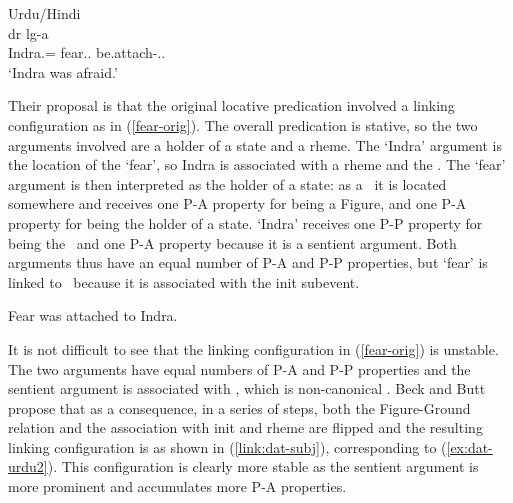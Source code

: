 \documentclass[output=paper,hidelinks]{langscibook}
\begin{document}
\ea\label{ex:dat-urdu2} Urdu/Hindi\\
  {d{\textscripta}r}    {l{\textscripta}g-a}  \\
{Indra.\M=\DAT}  {fear.\M.\NOM}    {be.attach-\PRF.\M.\SG} \\
\glt `Indra was afraid.'
\z 

Their proposal is that the original locative predication involved a linking configuration as in (\ref{fear-orig}).  The overall predication is stative, so the two arguments involved are a holder of a state and a rheme. The `Indra' argument is the location of the `fear', so Indra is associated with a rheme and the \GR. The  `fear' argument is then interpreted as the holder of a state: as a \FIG\ it is located somewhere and receives one P-A property for being a Figure, and one P-A property for being the holder of a state. `Indra' receives one P-P property for being the \GR\ and one P-A property because it is a sentient argument. Both arguments thus have an equal number of P-A and P-P properties, but `fear' is linked to \SUBJ\ because it is associated with the init subevent.  

\ea Fear was attached to Indra. \label{fear-orig}

 \hspace{1.1cm}
\z

It is not difficult to see that the linking configuration in (\ref{fear-orig}) is unstable.  The two arguments have equal numbers of P-A and P-P properties and the sentient argument is associated with \GR, which is non-canonical \citep{talmy78}. Beck and Butt propose that as a consequence, in a series of steps, both the Figure-Ground relation and the association with init and rheme are flipped and the resulting linking configuration is as shown in (\ref{link:dat-subj}), corresponding to (\ref{ex:dat-urdu2}).  This configuration is clearly more stable as the sentient  argument is  more prominent and accumulates more P-A properties. 
\end{document}
